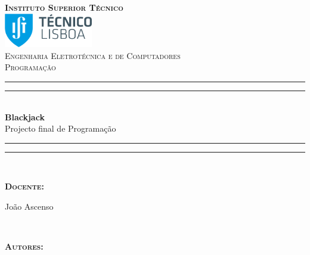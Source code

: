 \documentclass[12pt]{article}
\begin{document}
\begin{titlepage}
	
\thispagestyle{empty}
\newcommand{\HRule}{\rule{\linewidth}{0.5mm}} %
\center
\textsc{\bfseries\LARGE Instituto Superior Técnico}\\[1cm] %
\includegraphics[height=1.5cm]{IST_Logo}\\[2.5cm]
\textsc{\Large Engenharia Eletrotécnica e de Computadores}\\[0.5cm] %
\textsc{\large Programação}\\[0.5cm] %

\rule{\textwidth}{1.6pt}\vspace*{-\baselineskip}\vspace*{2pt} %
\rule{\textwidth}{0.4pt}\\[\baselineskip] %

{\LARGE \bfseries Blackjack}\\[0.2cm]
{\large Projecto final de Programação}\\[0.2cm] %

\rule{\textwidth}{0.4pt}\vspace*{-\baselineskip}\vspace{3.2pt} %
\rule{\textwidth}{1.6pt}\\[1.5cm]

\begin{minipage}{0.9\textwidth}
	\begin{flushleft} \large
		\begin{Large}\bfseries\textsc{Docente:}\end{Large} João Ascenso\\[0.4cm]
		\end{flushleft}
\end{minipage}\\[0.5cm]



\begin{minipage}{0.9\textwidth}
	\begin{flushleft} \large
		\begin{Large}\bfseries\textsc{Autores:}\end{Large}\\[0.4cm]
		\begin{tabular}{l l l} 
			

\end{tabular}
\end{flushleft}
\end{minipage}
\end{titlepage}
\end{document}
